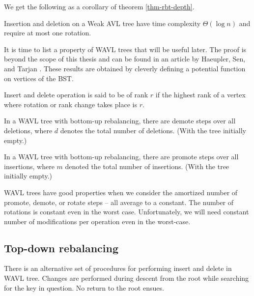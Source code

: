 







We get the following as a corollary of theorem \ref{thm-rbt-depth}.

\begin{prop}
Insertion and deletion on a Weak AVL tree have time complexity $\Theta(\log n)$ and require at most one rotation.
\end{prop}

It is time to list a property of WAVL trees that will be useful later. The proof is beyond the scope of this thesis and can be found in an article by Haeupler, Sen, and Tarjan \cite{rank-balanced-trees}. These results are obtained by cleverly defining a potential function on vertices of the BST.

\begin{defn}
Insert and delete operation is said to be of rank $r$ if the highest rank of a vertex where rotation or rank change takes place is $r$.
\end{defn}

\begin{thm}
In a WAVL tree with bottom-up rebalancing, there are  demote steps over all deletions, where $d$ denotes the total number of deletions. (With the tree initially empty.)
\end{thm}

\begin{thm}
In a WAVL tree with bottom-up rebalancing, there are  promote steps over all insertions, where $m$ denoted the total number of insertions. (With the tree initially empty.)
\end{thm}

WAVL trees have good properties when we consider the amortized number of promote, demote, or rotate steps -- all average to a constant. The number of rotations is constant even in the worst case. Unfortunately, we will need constant number of modifications per operation even in the worst-case.

\subsection{Top-down rebalancing}

There is an alternative set of procedures for performing insert and delete in WAVL tree. Changes are performed during descent from the root while searching for the key in question. No return to the root ensues.

